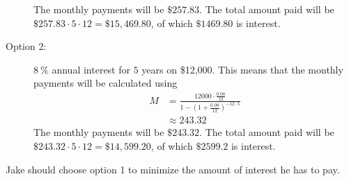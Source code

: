 \begin{problem}
\begin{subproblem}
\begin{shortsolution}
\begin{description}
			The monthly payments will be $\$257.83$. The total amount paid will be
			$\$257.83\cdot 5\cdot 12=\$15,469.80$, of which $\$1469.80$ is interest.
			\item[Option 2:] $\SI{8}{\percent}$ annual interest for $5$ years on \$12,000.
			This means that the monthly payments will be calculated using
			\begin{align*}
				M & = \frac{12000\cdot \frac{0.08}{12}}{1-\left( 1+\frac{0.08}{12} \right)^{-12\cdot 5}} \\ 
				  & \approx 243.32                                                                       
			\end{align*}
			The monthly payments will be $\$243.32$. The total amount paid 
			will be $\$243.32\cdot 5\cdot 12 =\$14,599.20$, of which $\$2599.2$ is 
			interest.
		\end{description}
		Jake should choose option 1 to minimize the amount of interest 
		he has to pay.
	\end{shortsolution}
\end{subproblem}
\end{problem}

